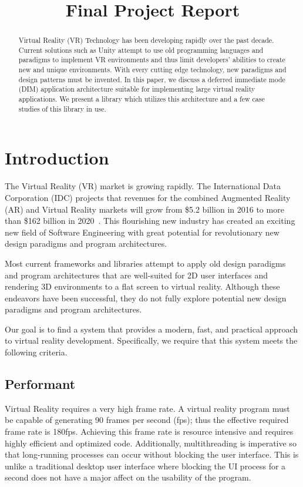 \documentclass[conference,12pt]{IEEEtran}
\title{Final Project Report}
\author{%
    \IEEEauthorblockN{%
        Jonathan Sumner Evans\IEEEauthorrefmark{1},
        Robinson Merillat\IEEEauthorrefmark{2}, and
        Sam Sartor\IEEEauthorrefmark{3}
    }
    \IEEEauthorblockA{%
        Department of Computer Science,
        Colorado School of Mines\\
        Golden, Colorado\\
        Email:
            \IEEEauthorrefmark{1}jonathanevans@mines.edu,
            \IEEEauthorrefmark{2}rdmerillat@mines.edu,
            \IEEEauthorrefmark{3}ssartor@mines.edu
    }
}
\begin{document}
\maketitle

\begin{abstract}
    Virtual Reality (VR) Technology has been developing rapidly over the past
    decade. Current solutions such as Unity attempt to use old programming
    languages and paradigms to implement VR environments and thus limit
    developers' abilities to create new and unique environments. With every
    cutting edge technology, new paradigms and design patterns must be invented.
    In this paper, we discuss a deferred immediate mode (DIM) application
    architecture suitable for implementing large virtual reality applications.
    We present a library which utilizes this architecture and a few case studies
    of this library in use.
\end{abstract}

\section{Introduction}
The Virtual Reality (VR) market is growing rapidly. The International Data
Corporation (IDC) projects that revenues for the combined Augmented Reality (AR)
and Virtual Reality markets will grow from \$5.2 billion in 2016 to more than
\$162 billion in 2020~\cite{IDC:2016:VR-industry}. This flourishing new industry
has created an exciting new field of Software Engineering with great potential
for revolutionary new design paradigms and program architectures.

Most current frameworks and libraries attempt to apply old design paradigms and
program architectures that are well-suited for 2D user interfaces and rendering
3D environments to a flat screen to virtual reality. Although these endeavors
have been successful, they do not fully explore potential new design paradigms
and program architectures.

Our goal is to find a system that provides a modern, fast, and practical
approach to virtual reality development. Specifically, we require that this
system meets the following criteria.

\subsection{Performant}
Virtual Reality requires a very high frame rate. A virtual reality program must
be capable of generating 90 frames per second (fps); thus the effective required
frame rate is 180fps.  Achieving this frame rate is resource intensive and
requires highly efficient and optimized code. Additionally, multithreading is
imperative so that long-running processes can occur without blocking the user
interface. This is unlike a traditional desktop user interface where blocking
the UI process for a second does not have a major affect on the usability of the
program.
\end{document}
